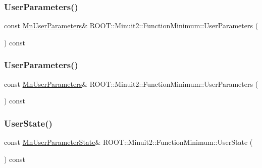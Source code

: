 \subsubsection{\texorpdfstring{UserParameters()}{UserParameters()}\hspace{0.1cm}{\footnotesize\ttfamily [1/2]}}
{\footnotesize\ttfamily const \mbox{\hyperlink{classROOT_1_1Minuit2_1_1MnUserParameters}{Mn\+User\+Parameters}}\& R\+O\+O\+T\+::\+Minuit2\+::\+Function\+Minimum\+::\+User\+Parameters (\begin{DoxyParamCaption}{ }\end{DoxyParamCaption}) const\hspace{0.3cm}{\ttfamily [inline]}}

\mbox{\label{classROOT_1_1Minuit2_1_1FunctionMinimum_ac916253d7e29de7da4da5bf4b84a2ad5}} 
\subsubsection{\texorpdfstring{UserParameters()}{UserParameters()}\hspace{0.1cm}{\footnotesize\ttfamily [2/2]}}
{\footnotesize\ttfamily const \mbox{\hyperlink{classROOT_1_1Minuit2_1_1MnUserParameters}{Mn\+User\+Parameters}}\& R\+O\+O\+T\+::\+Minuit2\+::\+Function\+Minimum\+::\+User\+Parameters (\begin{DoxyParamCaption}{ }\end{DoxyParamCaption}) const\hspace{0.3cm}{\ttfamily [inline]}}

\mbox{\label{classROOT_1_1Minuit2_1_1FunctionMinimum_a698dc320ec24e2288f391f160ef8213e}} 
\subsubsection{\texorpdfstring{UserState()}{UserState()}\hspace{0.1cm}{\footnotesize\ttfamily [1/2]}}
{\footnotesize\ttfamily const \mbox{\hyperlink{classROOT_1_1Minuit2_1_1MnUserParameterState}{Mn\+User\+Parameter\+State}}\& R\+O\+O\+T\+::\+Minuit2\+::\+Function\+Minimum\+::\+User\+State (\begin{DoxyParamCaption}{ }\end{DoxyParamCaption}) const\hspace{0.3cm}{\ttfamily [inline]}}

